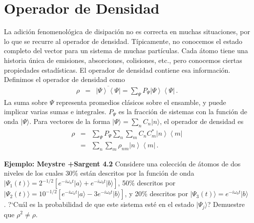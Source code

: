 \documentclass[twocolumn,aps,eqsecnum]{revtex4}
\providecommand{\ket}[1]{\lvert #1 \rangle}
\newcommand{\ketbra}[2]{\left| {#1} \right\rangle\left\langle {#2}\right|}
\begin{document}
\section{Operador de Densidad} 
La adici\'on fenomenol\'ogica de disipaci\'on no es correcta en muchas 
situaciones, por lo que se recurre al operador de densidad. T\'ipicamente, 
no conocemos el estado completo del vector para un sistema de muchas 
part\'iculas. Cada \'atomo tiene una historia \'unica de emisiones, absorciones, colisiones, etc., pero conocemos ciertas propiedades estad\'isticas. El 
operador de densidad contiene esa informaci\'on. Definimos el operador de 
densidad como 
%
\begin{eqnarray}
\rho &=& \overline{ \ketbra{\Psi}{\Psi} }	
	= \sum_{\Psi} P_{\Psi} \ketbra{\Psi}{\Psi} 	\,.
\end{eqnarray}
La suma sobre $\Psi$ representa promedios cl\'asicos sobre el ensamble, 
y puede implicar varias sumas e integrales. $P_{\Psi}$ es la fracci\'on de 
sistemas con la funci\'on de onda $\ket{\Psi}$.  Para vectores de la forma 
$\ket{\Psi} = \sum_n C_n \ket{n}$, el operador de densidad es 
%
\begin{eqnarray*}
\rho &=& \sum_{\Psi} P_{\Psi} \sum_n \sum_m C_n C_m^\ast 
	\ketbra{n}{m} 	\\ 
&=& \sum_n \sum_m \rho_{nm} \ketbra{n}{m}  	\,.
\end{eqnarray*}

\vspace{2mm} %
\textbf{Ejemplo: Meystre +Sargent 4.2} Considere una colecci\'on de 
\'atomos de dos niveles de los cuales 30\% est\'an descritos por la
 funci\'on de onda $\ket{\Psi_1(t)} = 2^{-1/2} [e^{-i \omega_a t} \ket{a} 
+e^{-i \omega_b t} \ket{b} ]$, 50\% descritos por 
$\ket{\Psi_2(t)} = 10^{-1/2} [ e^{-i \omega_a t} \ket{a} 
-3e^{-i \omega_b t} \ket{b} ]$, y 20\% descritos por 
$\ket{\Psi_3(t)} = e^{-i \omega_b t} \ket{b}$. ?`Cu\'al es la probabilidad 
de que este sistema est\'e en el estado $\ket{\Psi_j}$? Demuestre que 
$\rho^2 \neq \rho$. 
\end{document}
